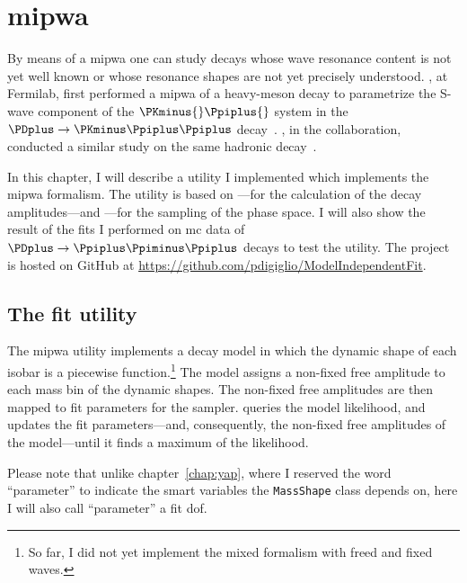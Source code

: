 \chapter{\texorpdfstring{\Acl{mipwa}}{Model-independent PWA}}
\label{chap:model_independent_pwa}

By means of a \acf{mipwa} one can study decays whose wave resonance content is not yet well known or whose resonance shapes are not yet precisely understood.
\citeauthor{PhysRevD.73.032004}, at Fermilab, first performed a \ac{mipwa} of a heavy-meson decay to parametrize the S-wave component of the $\PKminus{}\Ppiplus{}$ system in the $\PDplus\to\PKminus\Ppiplus\Ppiplus$ decay~\cite{PhysRevD.73.032004}.
\citeauthor{Link200914}, in the \focus{} collaboration, conducted a similar study on the same hadronic decay~\cite{Link200914}.


In this chapter, I will describe a utility I implemented which implements the \ac{mipwa} formalism.
The utility is based on ---for the calculation of the decay amplitudes---and ---for the sampling of the phase space.
I will also show the result of the fits I performed on \ac{mc} data of $\PDplus\to\Ppiplus\Ppiminus\Ppiplus$ decays to test the utility.
The project is hosted on \textsf{GitHub} at \url{https://github.com/pdigiglio/ModelIndependentFit}.


    \section{The fit utility}

    The \ac{mipwa} utility implements a  decay model in which the dynamic shape of each isobar is a piecewise function.\footnote{So far, I did not yet implement the mixed formalism with freed and fixed waves.}
    The model assigns a non-fixed free amplitude to each mass bin of the dynamic shapes.
    The non-fixed free amplitudes are then mapped to fit parameters for the  sampler.
     queries the model likelihood, and updates the fit parameters---and, consequently, the non-fixed free amplitudes of the  model---until it finds a maximum of the likelihood.


    Please note that unlike chapter~\ref{chap:yap}, where I reserved the word ``parameter'' to indicate the smart variables the \lstinline!MassShape! class depends on, here I will also call ``parameter'' a fit \ac{dof}.

